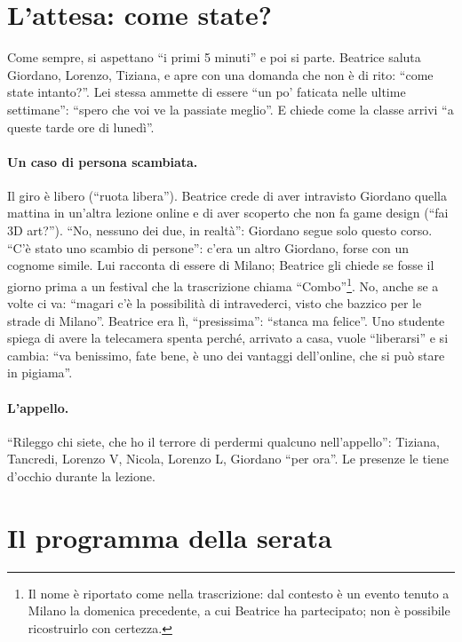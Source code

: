 \section{L'attesa: come state?}
\label{a9:sec:attesa}

Come sempre, si aspettano ``i primi 5 minuti'' e poi si parte. Beatrice saluta
Giordano, Lorenzo, Tiziana, e apre con una domanda che non è di rito: ``come state
intanto?''. Lei stessa ammette di essere ``un po' faticata nelle ultime settimane'':
``spero che voi ve la passiate meglio''. E chiede come la classe arrivi ``a queste
tarde ore di lunedì''.

\paragraph{Un caso di persona scambiata.} Il giro è libero (``ruota libera'').
Beatrice crede di aver intravisto Giordano quella mattina in un'altra lezione online
e di aver scoperto che non fa game design (``fai 3D art?''). ``No, nessuno dei due,
in realtà'': Giordano segue solo questo corso. ``C'è stato uno scambio di persone'':
c'era un altro Giordano, forse con un cognome simile. Lui racconta di essere di
Milano; Beatrice gli chiede se fosse il giorno prima a un festival che la trascrizione
chiama ``Combo''\footnote{Il nome è riportato come nella trascrizione: dal contesto è
un evento tenuto a Milano la domenica precedente, a cui Beatrice ha partecipato; non è
possibile ricostruirlo con certezza.}. No, anche se a volte ci va: ``magari c'è la
possibilità di intravederci, visto che bazzico per le strade di Milano''. Beatrice
era lì, ``presissima'': ``stanca ma felice''. Uno studente spiega di avere la
telecamera spenta perché, arrivato a casa, vuole ``liberarsi'' e si cambia: ``va
benissimo, fate bene, è uno dei vantaggi dell'online, che si può stare in pigiama''.

\paragraph{L'appello.} ``Rileggo chi siete, che ho il terrore di perdermi qualcuno
nell'appello'': Tiziana, Tancredi, Lorenzo V, Nicola, Lorenzo L, Giordano ``per
ora''. Le presenze le tiene d'occhio durante la lezione.

\section{Il programma della serata}
\label{a9:sec:programma}

